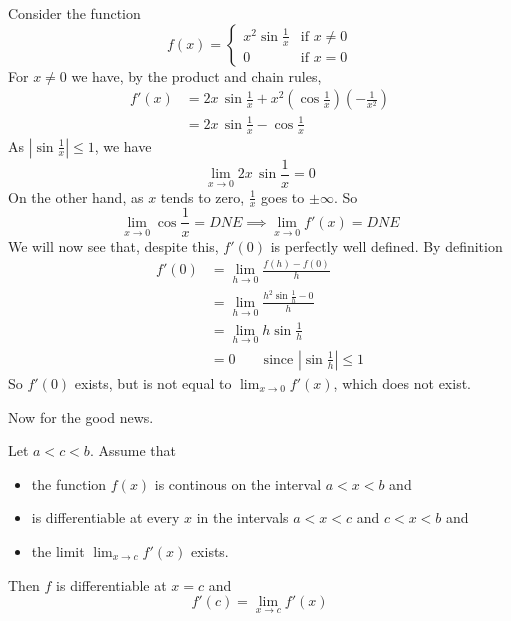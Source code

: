 \begin{eg}\label{eg:discontinuous derivative}
Consider the function
\begin{equation*}
f(x) = \begin{cases}
            x^2\sin\frac{1}{x} &\text{if $x\ne 0$} \\
             0                  &\text{if $x=0$}
        \end{cases}
\end{equation*}
For $x\ne 0$ we have, by the product and chain rules,
\begin{align*}
f'(x)  &= 2x\, \sin\frac{1}{x} + x^2 \left(\cos\frac{1}{x}\right)
                     \left(-\frac{1}{x^2}\right) \\
       &=  2x\, \sin\frac{1}{x} - \cos\frac{1}{x}
\end{align*}
As $\left|\sin\frac{1}{x}\right|\le 1$, we have
\begin{equation*}
\lim_{x\rightarrow 0}2x\, \sin\frac{1}{x}=0
\end{equation*}
On the other hand, as $x$ tends to zero, $\frac{1}{x}$ goes to $\pm\infty$.
So
\begin{equation*}
\lim_{x\rightarrow 0}\cos\frac{1}{x} = DNE
\implies 
\lim_{x\rightarrow 0}f'(x) = DNE
\end{equation*}
We will now see that, despite this, $f'(0)$ is perfectly well defined.
By definition
\begin{align*}
f'(0) &= \lim_{h\to 0}\frac{f(h)-f(0)}{h}  \\
      & = \lim_{h\to 0}\frac{h^2\sin\frac{1}{h}-0}{h} \\
      & = \lim_{h\to 0} h\sin\frac{1}{h} \\
      & = 0\qquad\text{since $\left|\sin\frac{1}{h}\right|\le 1$}
\end{align*}
So $f'(0)$ exists, but is not equal to $\lim_{x\rightarrow 0}f'(x)$,
which does not exist.
\end{eg}
Now for the good news.
\begin{theorem}\label{thm:continuous derivative}
Let $a<c<b$. Assume that 
\begin{itemize}
\item 
the function $f(x)$ is continous on the interval $a<x<b$ and
\item
is differentiable at every $x$ in the intervals $a<x<c$ and $c<x<b$ and
\item
the limit  $\lim_{x\rightarrow c}f'(x)$ exists.
\end{itemize}
Then $f$ is differentiable at $x=c$ and
\begin{equation*}
f'(c) = \lim_{x\rightarrow c}f'(x)
\end{equation*}
\end{theorem}

